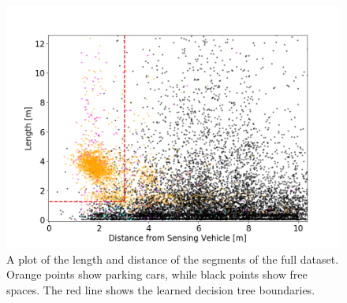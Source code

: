\begin{figure}
	\centering
	\includegraphics[width=\textwidth]{img/2d_length_distance_scatter_full_dataset_decision_tree_boundaries.png}
	\caption{A plot of the length and distance of the segments of the full dataset. Orange points show parking cars, while black points show free spaces. The red line shows the learned decision tree boundaries.}
	\label{fig:plot_2d_decision_tree}
\end{figure}